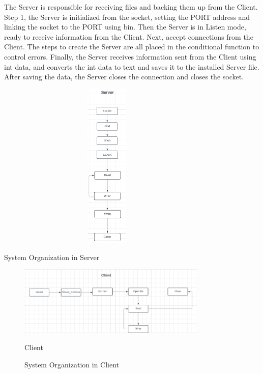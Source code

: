\documentclass{article}
\begin{document}
	\begin{minipage}{0.6\textwidth}
		The Server is responsible for receiving files and backing them up from the Client. Step 1, the Server is initialized from the socket, setting the PORT address and linking the socket to the PORT using bin. Then the Server is in Listen mode, ready to receive information from the Client. Next, accept connections from the Client. The steps to create the Server are all placed in the conditional function to control errors. Finally, the Server receives information sent from the Client using int data, and converts the int data to text and saves it to the installed Server file. After saving the data, the Server closes the connection and closes the socket.
	\end{minipage}%
	\begin{minipage}{0.4\textwidth}
		\begin{flushright}
			\includegraphics[width=0.8\textwidth, height = 8cm]{OragnizeSystemServer.png}
			\caption{System Organization in Server}
		\end{flushright}
	\end{minipage}

\begin{figure}[h]
	\centering
	\includegraphics[width=0.8\textwidth]{OragnizeSystemClient.png}
	\caption{System Organization in Client}Client
\end{figure}
	
\end{document}
